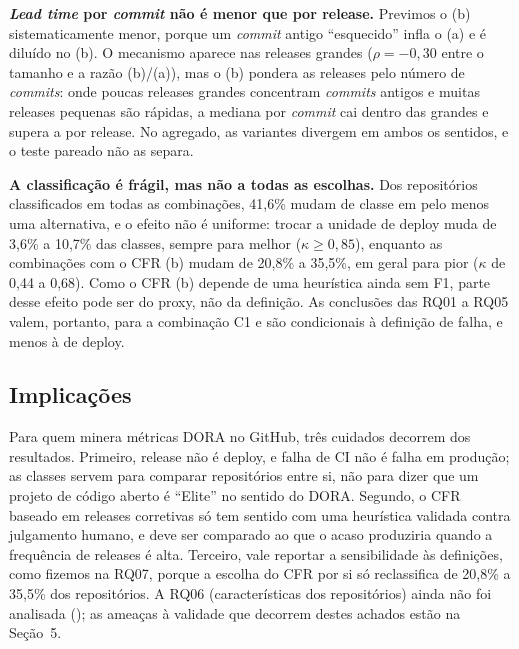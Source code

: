 \textbf{\textit{Lead time} por \textit{commit} não é menor que por release.} Previmos o (b) sistematicamente
menor, porque um \textit{commit} antigo ``esquecido'' infla o (a) e é diluído no (b). O mecanismo aparece nas
releases grandes ($\rho = -0{,}30$ entre o tamanho e a razão (b)/(a)), mas o (b) pondera as releases pelo
número de \textit{commits}: onde poucas releases grandes concentram \textit{commits} antigos e muitas releases
pequenas são rápidas, a mediana por \textit{commit} cai dentro das grandes e supera a por release. No
agregado, as variantes divergem em ambos os sentidos, e o teste pareado não as separa.

\textbf{A classificação é frágil, mas não a todas as escolhas.} Dos repositórios classificados em todas as
combinações, 41,6\% mudam de classe em pelo menos uma alternativa, e o efeito não é uniforme: trocar a
unidade de deploy muda de 3,6\% a 10,7\% das classes, sempre para melhor ($\kappa \geq 0{,}85$), enquanto as
combinações com o CFR (b) mudam de 20,8\% a 35,5\%, em geral para pior ($\kappa$ de 0,44 a 0,68). Como o CFR (b) depende de uma heurística
ainda sem F1, parte desse efeito pode ser do proxy, não da definição. As conclusões das RQ01 a RQ05
valem, portanto, para a combinação C1 e são condicionais à definição de falha, e menos à de deploy.

\subsection{Implicações}

Para quem minera métricas DORA no GitHub, três cuidados decorrem dos resultados. Primeiro, release
não é deploy, e falha de CI não é falha em produção; as classes servem para comparar repositórios entre si,
não para dizer que um projeto de código aberto é ``Elite'' no sentido do DORA. Segundo, o CFR
baseado em releases corretivas só tem sentido com uma heurística validada contra julgamento humano, e
deve ser comparado ao que o acaso produziria quando a frequência de releases é alta. Terceiro, vale
reportar a sensibilidade às definições, como fizemos na RQ07, porque a escolha do CFR por si só
reclassifica de 20,8\% a 35,5\% dos repositórios. A RQ06 (características dos repositórios)
ainda não foi analisada (); as ameaças à validade que decorrem
destes achados estão na Seção~5.
